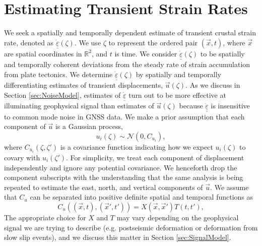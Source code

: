 \documentclass[10pt,letter]{article}
\newcommand*{\du}[1]{\underline{\underline{#1}}}
\begin{document}
\section{Estimating Transient Strain Rates}\label{sec:Method}
We seek a spatially and temporally dependent estimate of transient crustal strain rate, denoted as $\dot{\du{\varepsilon}}(\zeta)$. We use $\zeta$ to represent the ordered pair $(\vec{x},t)$, where $\vec{x}$ are spatial coordinates in $\mathbb{R}^2$, and $t$ is time. We consider $\dot{\du{\varepsilon}}(\zeta)$ to be spatially and temporally coherent deviations from the steady rate of strain accumulation from plate tectonics. We determine $\dot{\du{\varepsilon}}(\zeta)$ by spatially and temporally differentiating estimates of transient displacements, $\vec{u}(\zeta)$.  As we discuss in Section \ref{sec:NoiseModel}, estimates of $\dot{\du{\varepsilon}}$ turn out to be more effective at illuminating geophysical signal than estimates of $\vec{u}(\zeta)$ because $\dot{\du{\varepsilon}}$ is insensitive to common mode noise in GNSS data.  We make a prior assumption that each component of $\vec{u}$ is a Gaussian process,
\begin{equation}\label{eq:TransientDeformation}
u_i(\zeta) \sim \mathcal{N}\left(0,C_{u_i}\right),
\end{equation}
where $C_{u_i}(\zeta,\zeta')$ is a covariance function indicating how we expect $u_i(\zeta)$ to covary with $u_i(\zeta')$. For simplicity, we treat each component of displacement independently and ignore any potential covariance. We henceforth drop the component subscripts with the understanding that the same analysis is being repeated to estimate the east, north, and vertical components of $\vec{u}$. We assume that $C_u$ can be separated into positive definite spatial and temporal functions as 
\begin{equation}\label{eq:TransientCovariance}
C_{u}\left((\vec{x},t),(\vec{x}',t')\right) = X(\vec{x},\vec{x}')T(t,t'),
\end{equation}  
The appropriate choice for $X$ and $T$ may vary depending on the geophysical signal we are trying to describe (e.g. postseismic deformation or deformation from slow slip events), and we discuss this matter in Section \ref{sec:SignalModel}.  
\end{document}
